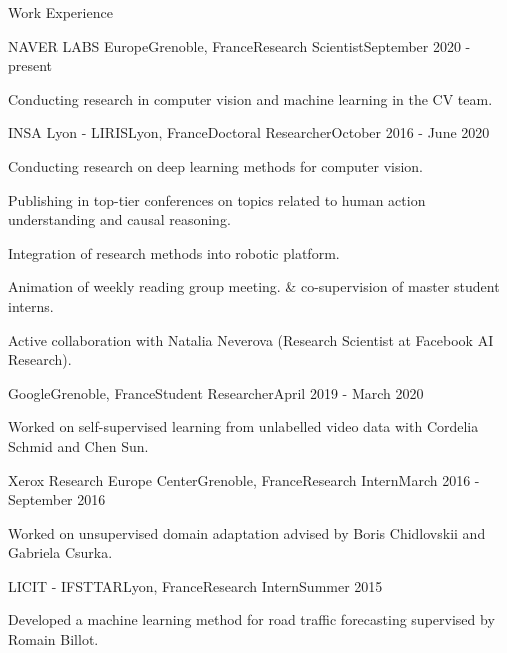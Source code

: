 \documentclass{resume} %
\begin{document}
\begin{rSection}{Work Experience}
    \begin{rSubsection}{NAVER LABS Europe}{Grenoble, France}{Research Scientist}{September 2020 - present}
                \item Conducting research in computer vision and machine learning in the CV team.
    \end{rSubsection}
     \begin{rSubsection}{INSA Lyon - LIRIS}{Lyon, France}{Doctoral Researcher}{October 2016 - June 2020}
                \item Conducting research on deep learning methods for computer vision.
                \item Publishing in top-tier conferences on topics related to human action understanding and causal reasoning.
                \item Integration of research methods into robotic platform.
                \item Animation of weekly reading group meeting. \& co-supervision of master student interns.
                \item Active collaboration with Natalia Neverova (Research Scientist at Facebook AI Research).
     \end{rSubsection}
     \begin{rSubsection}{Google}{Grenoble, France}{Student Researcher}{April 2019 - March 2020}
            \item Worked on self-supervised learning from unlabelled video data with Cordelia Schmid and Chen Sun.
    \end{rSubsection}
    \begin{rSubsection}{Xerox Research Europe Center}{Grenoble, France}{Research Intern}{March 2016 - September 2016}
            \item Worked on unsupervised domain adaptation advised by Boris Chidlovskii and Gabriela Csurka.
    \end{rSubsection}
    \begin{rSubsection}{LICIT - IFSTTAR}{Lyon, France}{Research Intern}{Summer 2015}
            \item Developed a machine learning method for road traffic forecasting supervised by Romain Billot.
    \end{rSubsection}
\end{rSection}
\end{document}
